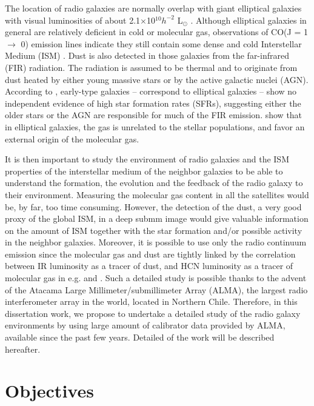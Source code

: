 The location of radio galaxies are normally overlap with giant elliptical galaxies with visual luminosities of about 2.1$\times$10$^{10} h^{-2}$ L$_\odot$  \citep{kellerman1988}. Although elliptical galaxies in general are relatively deficient in cold or molecular gas, observations of CO(J = 1$\rightarrow$ 0) emission lines indicate they still contain some dense and cold Interstellar Medium (ISM) \citep[e.g.,][]{wiklind1986}. Dust is also detected in those galaxies from the far-infrared (FIR) radiation. The radiation is assumed to be thermal and to originate from dust heated by either young massive stars or by the active galactic nuclei (AGN). According to \cite{kennicutt1998}, early-type galaxies -- correspond to elliptical galaxies -- show no independent evidence of high star formation rates (SFRs), suggesting either the older stars or the AGN are responsible for much of the FIR emission. \cite{wiklind1995} show that in elliptical galaxies, the gas is unrelated to the stellar populations, and favor an external origin of the molecular gas. 

It is then important to study the environment of radio galaxies and the ISM properties of the interstellar medium of the neighbor galaxies \citep{miley2008} to be able to understand the formation, the evolution and the feedback of the radio galaxy to their environment.  Measuring the molecular gas content in all the satellites would be, by far, too time consuming. However, the detection of the dust, a very good proxy of the global ISM, in a deep submm image would give valuable information on the amount of ISM  together with the star formation and/or possible activity in the neighbor galaxies. Moreover, it is possible to use only the radio  continuum emission since the molecular gas and dust are tightly linked by the correlation between IR luminosity as a tracer of dust, and HCN luminosity as a tracer of molecular gas in e.g. \cite{omont1996} and \cite{gaosolomon2004}. Such a detailed study is possible thanks to the advent of the Atacama Large Millimeter/submillimeter Array (ALMA), the largest radio interferometer array in the world, located in Northern Chile. Therefore, in this dissertation work, we propose to undertake a detailed study of the radio galaxy environments by using large amount of calibrator data provided by ALMA, available since the past few years. Detailed of the work will be described hereafter. 

\section{Objectives}

